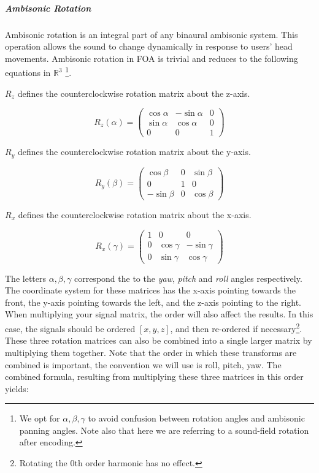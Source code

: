 \subparagraph{Ambisonic Rotation}

Ambisonic rotation is an integral part of any binaural ambisonic system. This operation allows the sound to change dynamically in response to users' head movements. Ambisonic rotation in FOA is trivial and reduces to the following equations in $\mathbb{R}^{3}$ \cite{kronlachner2014spatial}\footnote{We opt for $\alpha, \beta, \gamma$ to avoid confusion between rotation angles and ambisonic panning angles. Note also that here we are referring to a sound-field rotation after encoding.}. 

$R_z$ defines the counterclockwise rotation matrix about the z-axis.

\begin{equation}
R_{z}(\alpha)=\left(\begin{array}{ccc}
\cos \alpha & -\sin \alpha & 0 \\
\sin \alpha & \cos \alpha & 0 \\
0 & 0 & 1
\end{array}\right)
\end{equation}

$R_y$ defines the counterclockwise rotation matrix about the y-axis.

\begin{equation}
R_{y}(\beta)=\left(\begin{array}{ccc}
\cos \beta & 0 & \sin \beta \\
0 & 1 & 0 \\
-\sin \beta & 0 & \cos \beta
\end{array}\right)
\end{equation}

$R_x$ defines the counterclockwise rotation matrix about the x-axis.

\begin{equation}
R_{x}(\gamma)=\left(\begin{array}{ccc}
1 & 0 & 0 \\
0 & \cos \gamma & -\sin \gamma \\
0 & \sin \gamma & \cos \gamma
\end{array}\right)
\end{equation}

The letters $\alpha, \beta, \gamma$ correspond the to the \textit{yaw}, \textit{pitch} and \textit{roll} angles respectively. The coordinate system for these matrices has the x-axis pointing towards the front, the y-axis pointing towards the left, and the z-axis pointing to the right. When multiplying your signal matrix, the order will also affect the results. In this case, the signals should be ordered $[x, y, z]$, and then re-ordered if necessary\footnote{Rotating the 0th order harmonic has no effect.}. These three rotation matrices can also be combined into a single larger matrix by multiplying them together. Note that the order in which these transforms are combined is important, the convention we will use is roll, pitch, yaw. The combined formula, resulting from multiplying these three matrices in this order yields:

